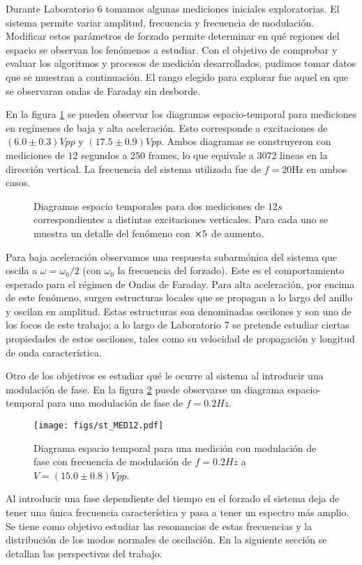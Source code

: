 \documentclass[../main.tex]{subfiles}
\begin{document}
Durante Laboratorio 6 tomamos algunas mediciones iniciales exploratorias. El sistema permite variar amplitud, frecuencia y frecuencia de modulación. Modificar estos parámetros de forzado permite determinar en qué regiones del espacio se observan los fenómenos a estudiar. 
Con el objetivo de comprobar y evaluar los algoritmos y procesos de medición desarrollados, pudimos tomar datos que se muestran a continuación. El rango elegido para explorar fue aquel en que se observaran ondas de Faraday sin desborde. 

En la figura \ref{fig:st_alta_baja} se pueden observar los diagramas espacio-temporal para mediciones en regímenes de baja y alta aceleración. Esto corresponde a excitaciones de $(6.0 \pm 0.3) \si{Vpp}$ y $(17.5\pm0.9)\si{Vpp}$. Ambos diagramas se construyeron con mediciones de $12$ segundos a $250$ frames, lo que equivale a $3072$ lineas en la dirección vertical. La frecuencia del sistema utilizada fue de $f = 20$Hz en ambos casos.

\begin{figure}[H]
    \centering
    \caption{Diagramas espacio temporales para dos mediciones de $12\si{s}$ correspondientes a distintas excitaciones verticales. Para cada uno se muestra un detalle del fenómeno con $\cross5$ de aumento. }%
    \label{fig:st_alta_baja}
\end{figure}

Para baja aceleración observamos una respuesta subarmónica del sistema que oscila a $\omega = \omega_0/2$ (con $\omega_0$ la frecuencia del forzado). Este es el comportamiento esperado para el régimen de Ondas de Faraday. Para alta aceleración, por encima de este fenómeno, surgen estructuras locales que se propagan a lo largo del anillo y oscilan en amplitud. Estas estructuras son denominadas oscilones y son uno de los focos de este trabajo; a lo largo de Laboratorio 7 se pretende estudiar ciertas propiedades de estos oscilones, tales como su velocidad de propagación y longitud de onda característica.

Otro de los objetivos es estudiar qué le ocurre al sistema al introducir una modulación de fase. En la figura \ref{fig:st_modulacion} puede observarse un diagrama espacio-temporal para una modulación de fase de $f=0.2 \si{Hz}$.

\begin{figure}[H]
    \centering
    \texttt{[image: figs/st\_MED12.pdf]}
    \caption{Diagrama espacio temporal para una medición con modulación de fase con frecuencia de modulación de $f=0.2\si{Hz}$ a $V = (15.0\pm0.8) \si{Vpp}$. }
    \label{fig:st_modulacion}
\end{figure}

Al introducir una fase dependiente del tiempo en el forzado el sistema deja de tener una única frecuencia característica y pasa a tener un espectro más amplio. Se tiene como objetivo estudiar las resonancias de estas frecuencias y la distribución de los modos normales de oscilación. En la siguiente sección se detallan las perspectivas del trabajo.
\end{document}
